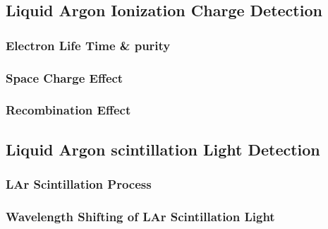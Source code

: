 \subsection{Liquid Argon Ionization Charge Detection}
\subsubsection{Electron Life Time \& purity}
\subsubsection{Space Charge Effect}
\subsubsection{Recombination Effect}
\subsection{Liquid Argon scintillation Light Detection}
\subsubsection{LAr Scintillation Process}
\subsubsection{Wavelength Shifting of LAr Scintillation Light}
